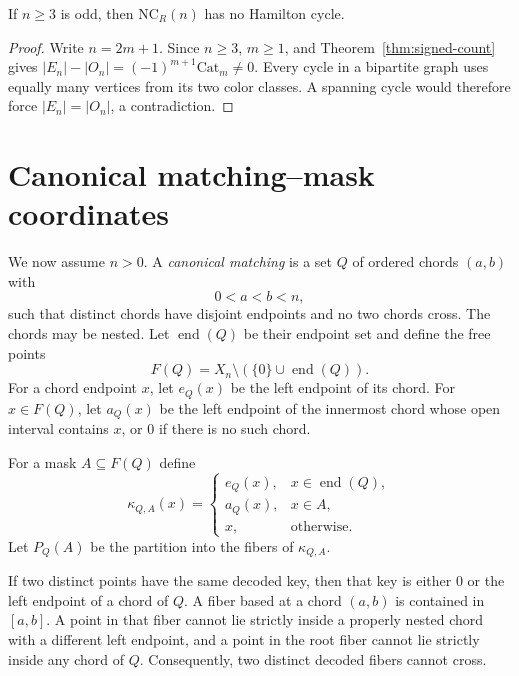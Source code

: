 \documentclass[12pt]{article}
\newcommand{\NCR}{\mathrm{NC}_R}
\newcommand{\catalan}{\mathrm{Cat}}
\begin{document}
\begin{theorem}\label{thm:odd-obstruction}
If $n\geq3$ is odd, then $\NCR(n)$ has no Hamilton cycle.
\end{theorem}

\begin{proof}
Write $n=2m+1$.  Since $n\geq3$, $m\geq1$, and
Theorem~\ref{thm:signed-count} gives
$|E_n|-|O_n|=(-1)^{m+1}\catalan_m\neq0$.  Every cycle in a bipartite graph
uses equally many vertices from its two color classes.  A spanning cycle
would therefore force $|E_n|=|O_n|$, a contradiction.
\end{proof}

\section{Canonical matching--mask coordinates}\label{sec:coordinates}

We now assume $n>0$.  A \emph{canonical matching} is a set $Q$ of ordered
chords $(a,b)$ with
\[
 0<a<b<n,
\]
such that distinct chords have disjoint endpoints and no two chords cross.
The chords may be nested.  Let $\operatorname{end}(Q)$ be their endpoint set
and define the free points
\[
 F(Q)=X_n\setminus(\{0\}\cup\operatorname{end}(Q)).
\]
For a chord endpoint $x$, let $e_Q(x)$ be the left endpoint of its chord.
For $x\in F(Q)$, let $a_Q(x)$ be the left endpoint of the innermost chord
whose open interval contains $x$, or $0$ if there is no such chord.

For a mask $A\subseteq F(Q)$ define
\begin{equation}\label{eq:decode-key}
 \kappa_{Q,A}(x)=
 \begin{cases}
 e_Q(x),&x\in\operatorname{end}(Q),\\
 a_Q(x),&x\in A,\\
 x,&\text{otherwise}.
 \end{cases}
\end{equation}
Let $P_Q(A)$ be the partition into the fibers of $\kappa_{Q,A}$.

\begin{lemma}\label{lem:key-fibers}
If two distinct points have the same decoded key, then that key is either
$0$ or the left endpoint of a chord of $Q$.  A fiber based at a chord
$(a,b)$ is contained in $[a,b]$.  A point in that fiber cannot lie strictly
inside a properly nested chord with a different left endpoint, and a point
in the root fiber cannot lie strictly inside any chord of $Q$.
Consequently, two distinct decoded fibers cannot cross.
\end{lemma}
\end{document}
